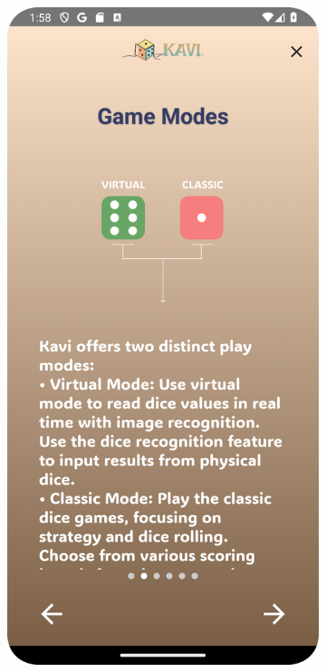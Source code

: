 \begin{figure}[h]
    \centering
    \begin{subfigure}[b]{0.27\textwidth}
        \centering
        \includegraphics[width=\textwidth]{img/instructions screen.png}

\end{subfigure}
\end{figure}
